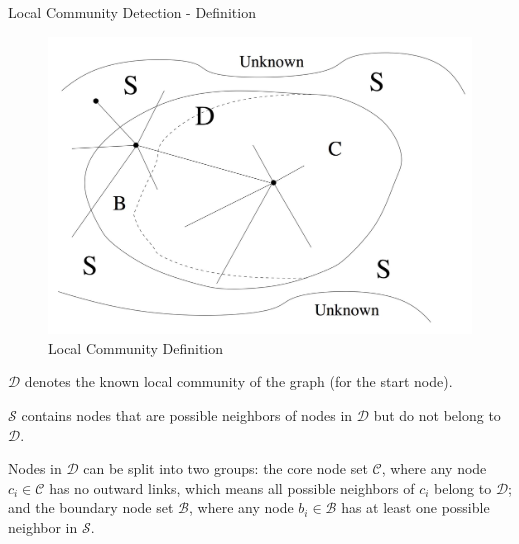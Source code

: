 \documentclass[9pt]{beamer}
\begin{document}
\begin{frame}{Local Community Detection - Definition}

\begin{figure}
\centering
\includegraphics[scale = 0.1]{localCommunityDefinition.jpeg}
\caption{Local Community Definition}
\label{Local_Community_Definition}
\end{figure}
\small %

$\mathcal{D}$ denotes the known local community of the graph (for the start node). 

$\mathcal{S}$ contains nodes that are possible neighbors of nodes in $\mathcal{D}$ but do not belong to $\mathcal{D}$. 

Nodes in $\mathcal{D}$ can be split into two groups: the core node set $\mathcal{C}$, where any node $c_i\in \mathcal{C}$ has no outward links, which means all possible neighbors of $c_i$ belong to $\mathcal{D}$; and the boundary node set $\mathcal{B}$, where any node $b_i\in \mathcal{B}$ has at least one possible neighbor in $\mathcal{S}$.
\end{frame}

    
\end{document}
